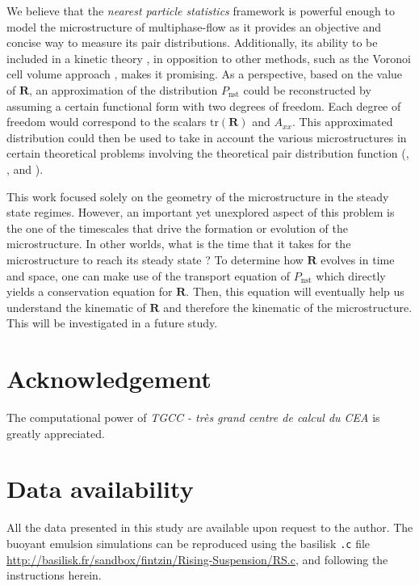 We believe that the \textit{nearest particle statistics} framework is powerful enough to model the microstructure of multiphase-flow as it provides an objective and concise way to measure its pair distributions. 
Additionally, its ability to be included in a kinetic theory \citep{zhang2023evolution}, in opposition to other methods,  such as the Voronoi cell volume approach \citep{senthil2005voronoi}, makes it promising. As a perspective, based on the value of $\textbf{R}$, an approximation of the distribution $P_\text{nst}$ could be reconstructed by assuming a certain functional form with two degrees of freedom.
Each degree of freedom would correspond to the scalars $\text{tr}(\textbf{R})$ and $A_{xx}$.
This approximated distribution could then be used to take in account the various microstructures in certain theoretical problems involving the theoretical pair distribution function (\citet{batchelor1972sedimentation}, \citet{hinch1977averaged,wang1999longitudinal}, and \citet{zhang2021ensemble}).

This work focused solely on the geometry of the microstructure in the steady state regimes. 
However, an important yet unexplored aspect of this problem is the one of the timescales that drive the formation or evolution of the microstructure. 
In other worlds, what is the time that it takes for the microstructure to reach its steady state ? 
To determine how $\textbf{R}$ evolves in time and space, one can make use of the transport equation of $P_\text{nst}$ which directly yields a conservation equation for $\textbf{R}$. 
Then, this equation will eventually help us understand the kinematic of $\textbf{R}$ and therefore the kinematic of the microstructure. 
This will be investigated in a future study. 


 

\section*{Acknowledgement}

The computational power of  \textit{TGCC - tr\`es grand centre de calcul du CEA} is greatly appreciated. 
\section*{Data availability}

All the data presented in this study are available upon request to the author. 
The buoyant emulsion simulations can be reproduced using the basilisk \texttt{.c} file \url{http://basilisk.fr/sandbox/fintzin/Rising-Suspension/RS.c}, and following the instructions herein. 

